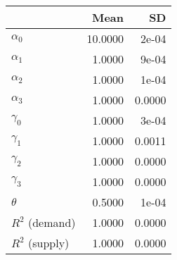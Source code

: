 
\begin{tabular}[t]{lrr}
\toprule
  & Mean & SD\\
\midrule
$\alpha_{0}$ & 10.0000 & 2e-04\\
$\alpha_{1}$ & 1.0000 & 9e-04\\
$\alpha_{2}$ & 1.0000 & 1e-04\\
$\alpha_{3}$ & 1.0000 & 0.0000\\
$\gamma_{0}$ & 1.0000 & 3e-04\\
$\gamma_{1}$ & 1.0000 & 0.0011\\
$\gamma_{2}$ & 1.0000 & 0.0000\\
$\gamma_{3}$ & 1.0000 & 0.0000\\
$\theta$ & 0.5000 & 1e-04\\
$R^{2}$ (demand) & 1.0000 & 0.0000\\
$R^{2}$ (supply) & 1.0000 & 0.0000\\
\bottomrule
\end{tabular}
